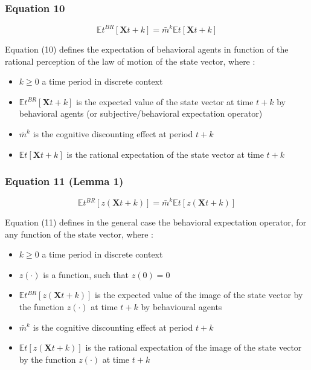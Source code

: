 \documentclass{article}
\begin{document}
\subsubsection*{Equation 10}

\begin{equation}
    \mathbb{E}{t}^{BR}\left[\bm{X}{t+k}\right]=\bar{m}^{k}\mathbb{E}{t}\left[\bm{X}{t+k}\right]
\end{equation}

Equation (10) defines the expectation of behavioral agents in function of the rational perception of the law of motion of the state vector, where : 
\begin{itemize}
    \item $k\geq 0$ a time period in discrete context
    \item $\mathbb{E}{t}^{BR}\left[\bm{X}{t+k}\right]$ is the expected value of the state vector at time $t+k$ by behavioral agents (or subjective/behavioral expectation operator)
    \item $\bar{m}^{k}$ is the cognitive discounting effect at period $t+k$
    \item $\mathbb{E}{t}\left[\bm{X}{t+k}\right]$ is the rational expectation of the state vector at time $t+k$
\end{itemize}

\subsubsection*{Equation 11 (Lemma 1)}

\begin{equation}
    \mathbb{E}{t}^{BR}\left[z\left(\bm{X}{t+k}\right)\right]=\bar{m}^{k}\mathbb{E}{t}\left[z\left(\bm{X}{t+k}\right)\right]
\end{equation}

Equation (11) defines in the general case the behavioral expectation operator, for any function of the state vector, where : 
\begin{itemize}
    \item $k\geq 0$ a time period in discrete context
    \item $z(\cdot)$ is a function, such that $z(0)=0$
    \item $\mathbb{E}{t}^{BR}\left[z\left(\bm{X}{t+k}\right)\right]$ is the expected value of the image of the state vector by the function $z(\cdot)$ at time $t+k$ by behavioural agents
    \item $\bar{m}^{k}$ is the cognitive discounting effect at period $t+k$
    \item $\mathbb{E}{t}\left[z\left(\bm{X}{t+k}\right)\right]$ is the rational expectation of the image of the state vector by the function $z(\cdot)$ at time $t+k$
\end{itemize}
\end{document}
